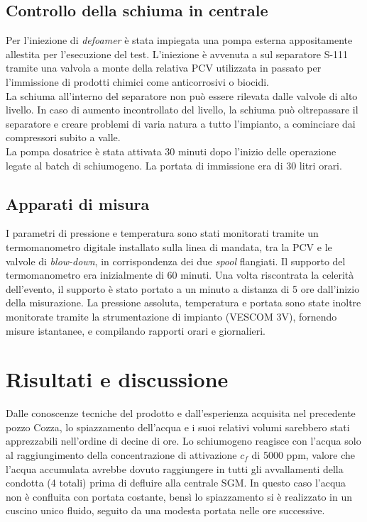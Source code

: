 \subsection{Controllo della schiuma in centrale}
Per l'iniezione di \textit{defoamer} è stata impiegata una pompa esterna appositamente allestita per l'esecuzione del test. L'iniezione è avvenuta a sul separatore S-111 tramite una valvola a monte della relativa PCV utilizzata in passato per l'immissione di prodotti chimici come anticorrosivi o biocidi.\\
La schiuma all'interno del separatore non può essere rilevata dalle valvole di alto livello. In caso di aumento incontrollato del livello, la schiuma può oltrepassare il separatore e creare problemi di varia natura a tutto l'impianto, a cominciare dai compressori subito a valle.\\
La pompa dosatrice è stata attivata 30 minuti dopo l'inizio delle operazione legate al batch di schiumogeno. La portata di immissione era di 30 litri orari.


\subsection{Apparati di misura}
I parametri di pressione e temperatura sono stati monitorati tramite un termomanometro digitale installato sulla linea di mandata, tra la PCV e le valvole di \textit{blow-down}, in corrispondenza dei due \textit{spool} flangiati. Il supporto del termomanometro era inizialmente di 60 minuti. Una volta riscontrata la celerità dell'evento, il supporto è stato portato a un minuto a distanza di 5 ore dall'inizio della misurazione. La pressione assoluta, temperatura e portata sono state inoltre monitorate tramite la strumentazione di impianto (VESCOM 3V), fornendo misure istantanee, e compilando rapporti orari e giornalieri.

\section{Risultati e discussione}
Dalle conoscenze tecniche del prodotto e dall'esperienza acquisita nel precedente pozzo Cozza, lo spiazzamento dell'acqua e i suoi relativi volumi sarebbero stati apprezzabili nell'ordine di decine di ore. Lo schiumogeno reagisce con l'acqua solo al raggiungimento della concentrazione di attivazione \(c_{f}\) di 5000 ppm, valore che l'acqua accumulata avrebbe dovuto raggiungere in tutti gli avvallamenti della condotta (4 totali) prima di defluire alla centrale SGM. In questo caso l'acqua non è confluita con portata costante, bensì lo spiazzamento si è realizzato in un cuscino unico fluido, seguito da una modesta portata nelle ore successive.
